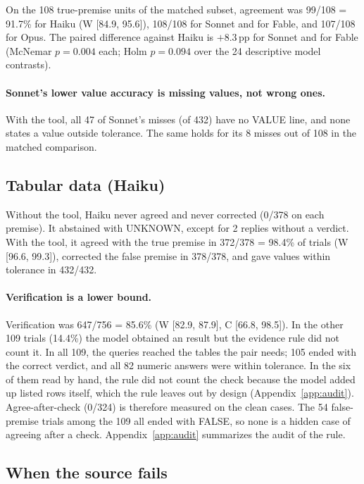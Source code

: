 \documentclass[11pt]{article}
\DeclareRobustCommand{\code}[1]{\texttt{\detokenize{#1}}}
\newcommand{\pp}{\,pp}
\newcommand{\Aac}{Agree-after-check}
\begin{document}
On the 108 true-premise units of the matched subset, agreement was 99/108 = 91.7\% for Haiku (W [84.9, 95.6]), 108/108 for Sonnet and for Fable, and 107/108 for Opus.
The paired difference against Haiku is $+8.3$\pp{} for Sonnet and for Fable (McNemar $p = 0.004$ each; Holm $p = 0.094$ over the 24 descriptive model contrasts).

\paragraph{Sonnet's lower value accuracy is missing values, not wrong ones.}
With the tool, all 47 of Sonnet's misses (of 432) have no VALUE line, and none states a value outside tolerance.
The same holds for its 8 misses out of 108 in the matched comparison.

\subsection{Tabular data (Haiku)}
\label{sec:res-tabular}

Without the tool, Haiku never agreed and never corrected (0/378 on each premise).
It abstained with UNKNOWN, except for 2 replies without a verdict.
With the tool, it agreed with the true premise in 372/378 = 98.4\% of trials (W [96.6, 99.3]), corrected the false premise in 378/378, and gave values within tolerance in 432/432.

\paragraph{Verification is a lower bound.}
Verification was 647/756 = 85.6\% (W [82.9, 87.9], C [66.8, 98.5]).
In the other 109 \code{tool} trials (14.4\%) the model obtained an \code{ok} result but the evidence rule did not count it.
In all 109, the queries reached the tables the pair needs; 105 ended with the correct verdict, and all 82 numeric answers were within tolerance.
In the six of them read by hand, the rule did not count the check because the model added up listed rows itself, which the rule leaves out by design (Appendix~\ref{app:audit}).
\Aac{} (0/324) is therefore measured on the clean cases.
The 54 false-premise trials among the 109 all ended with FALSE, so none is a hidden case of agreeing after a check.
Appendix~\ref{app:audit} summarizes the audit of the rule.

\subsection{When the source fails}
\label{sec:res-fault}
\end{document}
